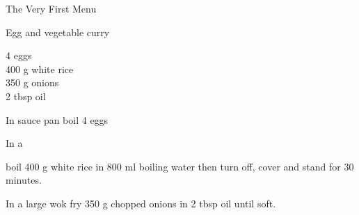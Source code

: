 \begin{menu}{The Very First Menu}
    \begin{recipe}{2}{Egg and vegetable curry}%
    
	
		\begin{ingredients}
		4  eggs  \\
	400 g white rice  \\
	350 g onions  \\
	2 tbsp oil  \\
	
		\end{ingredients}
	
    \begin{instructions}
    \item 
				In sauce pan boil
				4   eggs\item 
      In a 
       
      boil 
      400 g  white rice
      in 
      800 ml  boiling water
      then turn off, cover and stand for 30 minutes.
    \item 
        In a large wok fry
        350 g chopped onions
        in
        2 tbsp  oil
        until soft.
      
    \end{instructions}
    \end{recipe}%
  
    \clearpage
    \end{menu}
	
